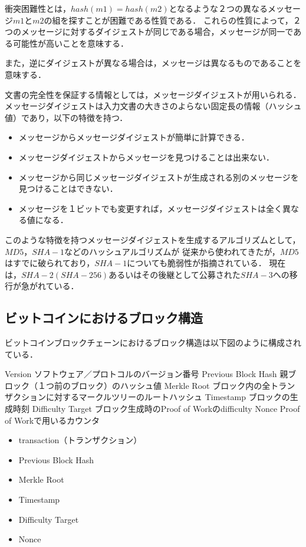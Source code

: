 \documentclass[a4paper,12pt]{jsarticle}
\begin{document}
衝突困難性とは，$hash(m1)= hash(m2)$となるような２つの異なるメッセージ$m1$と$m2$の組を探すことが困難である性質である．
これらの性質によって，２つのメッセージに対するダイジェストが同じである場合，メッセージが同一である可能性が高いことを意味する．

また，逆にダイジェストが異なる場合は，メッセージは異なるものであることを意味する．

文書の完全性を保証する情報としては，メッセージダイジェストが用いられる．
メッセージダイジェストは入力文書の大きさのよらない固定長の情報（ハッシュ値）であり，以下の特徴を持つ．

\begin{itemize}
  \item メッセージからメッセージダイジェストが簡単に計算できる．
  \item メッセージダイジェストからメッセージを見つけることは出来ない．
  \item メッセージから同じメッセージダイジェストが生成される別のメッセージを見つけることはできない．
  \item メッセージを１ビットでも変更すれば，メッセージダイジェストは全く異なる値になる．
\end{itemize}

このような特徴を持つメッセージダイジェストを生成するアルゴリズムとして，$MD5$，$SHA-1$などのハッシュアルゴリズムが
従来から使われてきたが，$MD5$はすでに破られており，$SHA-1$についても脆弱性が指摘されている．
現在は，$SHA-2(SHA-256)$あるいはその後継として公募された$SHA-3$への移行が急がれている．

\subsection{ビットコインにおけるブロック構造}
ビットコインブロックチェーンにおけるブロック構造は以下図のように構成されている．

	Version	ソフトウェア／プロトコルのバージョン番号
	Previous Block Hash	親ブロック（１つ前のブロック）のハッシュ値
	Merkle Root	ブロック内の全トランザクションに対するマークルツリーのルートハッシュ
	Timestamp	ブロックの生成時刻
	Difficulty Target	ブロック生成時のProof of Workのdifficulty
	Nonce	Proof of Workで用いるカウンタ
\begin{itemize}
    \item transaction（トランザクション）
    \item Previous Block Hash
    \item Merkle Root
    \item Timestamp
    \item Difficulty Target
    \item Nonce
\end{itemize}
\end{document}
